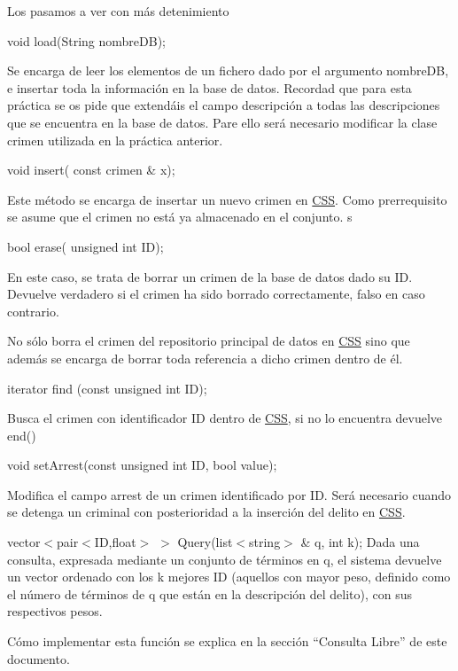 Los pasamos a ver con más detenimiento

\begin{DoxyItemize}
\item void load(\+String nombre\+D\+B);\end{DoxyItemize}
Se encarga de leer los elementos de un fichero dado por el argumento nombre\+D\+B, e insertar toda la información en la base de datos. Recordad que para esta práctica se os pide que extendáis el campo descripción a todas las descripciones que se encuentra en la base de datos. Pare ello será necesario modificar la clase crimen utilizada en la práctica anterior.

\begin{DoxyItemize}
\item void insert( const crimen \& x);\end{DoxyItemize}
Este método se encarga de insertar un nuevo crimen en \hyperlink{classCSS}{C\+S\+S}. Como prerrequisito se asume que el crimen no está ya almacenado en el conjunto. s \begin{DoxyItemize}
\item bool erase( unsigned int I\+D);\end{DoxyItemize}
En este caso, se trata de borrar un crimen de la base de datos dado su I\+D. Devuelve verdadero si el crimen ha sido borrado correctamente, falso en caso contrario.

No sólo borra el crimen del repositorio principal de datos en \hyperlink{classCSS}{C\+S\+S} sino que además se encarga de borrar toda referencia a dicho crimen dentro de él.

\begin{DoxyItemize}
\item iterator find (const unsigned int I\+D);\end{DoxyItemize}
Busca el crimen con identificador I\+D dentro de \hyperlink{classCSS}{C\+S\+S}, si no lo encuentra devuelve end()

\begin{DoxyItemize}
\item void set\+Arrest(const unsigned int I\+D, bool value);\end{DoxyItemize}
Modifica el campo arrest de un crimen identificado por I\+D. Será necesario cuando se detenga un criminal con posterioridad a la inserción del delito en \hyperlink{classCSS}{C\+S\+S}.

\begin{DoxyItemize}
\item vector$<$pair$<$\+I\+D,float$>$ $>$ Query(list$<$string$>$ \& q, int k); Dada una consulta, expresada mediante un conjunto de términos en q, el sistema devuelve un vector ordenado con los k mejores I\+D (aquellos con mayor peso, definido como el número de términos de q que están en la descripción del delito), con sus respectivos pesos.\end{DoxyItemize}
Cómo implementar esta función se explica en la sección “\+Consulta Libre” de este documento.

